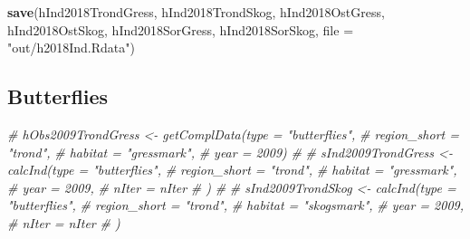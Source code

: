 \documentclass[]{article}
\newenvironment{Shaded}{\begin{snugshade}}{\end{snugshade}}
\newcommand{\KeywordTok}[1]{\textcolor[rgb]{0.13,0.29,0.53}{\textbf{#1}}}
\newcommand{\DataTypeTok}[1]{\textcolor[rgb]{0.13,0.29,0.53}{#1}}
\newcommand{\StringTok}[1]{\textcolor[rgb]{0.31,0.60,0.02}{#1}}
\newcommand{\CommentTok}[1]{\textcolor[rgb]{0.56,0.35,0.01}{\textit{#1}}}
\newcommand{\NormalTok}[1]{#1}
\begin{document}
\begin{Shaded}
\begin{Highlighting}[]
\KeywordTok{save}\NormalTok{(hInd2018TrondGress, hInd2018TrondSkog, hInd2018OstGress, hInd2018OstSkog, hInd2018SorGress, hInd2018SorSkog, }\DataTypeTok{file =} \StringTok{"out/h2018Ind.Rdata"}\NormalTok{)}
\end{Highlighting}
\end{Shaded}

\subsection{Butterflies}\label{butterflies}

\begin{Shaded}
\begin{Highlighting}[]
\CommentTok{# hObs2009TrondGress <- getComplData(type = "butterflies",}
\CommentTok{#                                    region_short = "trond",}
\CommentTok{#                                    habitat = "gressmark",}
\CommentTok{#                                    year = 2009)}
\CommentTok{# }
\CommentTok{# sInd2009TrondGress <- calcInd(type = "butterflies",}
\CommentTok{#                               region_short = "trond",}
\CommentTok{#                               habitat = "gressmark",}
\CommentTok{#                               year = 2009,}
\CommentTok{#                               nIter = nIter}
\CommentTok{#                               )}
\CommentTok{# }
\CommentTok{# sInd2009TrondSkog <- calcInd(type = "butterflies",}
\CommentTok{#                               region_short = "trond",}
\CommentTok{#                               habitat = "skogsmark",}
\CommentTok{#                               year = 2009,}
\CommentTok{#                               nIter = nIter}
\CommentTok{#                               )}


\end{Highlighting}
\end{Shaded}
\end{document}

